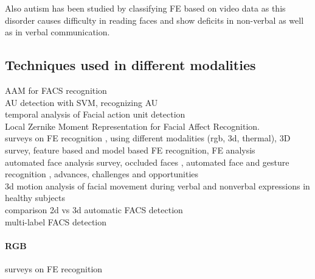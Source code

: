 Also autism has been studied by classifying FE based on video data \cite{Valstar2014automatic} as this disorder causes difficulty in reading faces and show deficits in non-verbal as well as in verbal communication.

\subsection{Techniques used in different modalities}




AAM for FACS recognition \cite{Lucey2007}\\


AU detection with SVM\cite{Simon2010}, recognizing AU \cite{Tian2001}\\

temporal analysis of Facial action unit detection \cite{Valstar2006}\\

Local Zernike Moment Representation for Facial Affect Recognition. \cite{Sariyanidi2013}\\

surveys on FE recognition \cite{Anil2016}\cite{Pantic2000}\cite{Sariyanidi2015}, using different modalities (rgb, 3d, thermal)\cite{Corneanu2016survey}, 3D \cite{Danelakis2015}survey\cite{Sandbach2012survey}, feature based and model based FE recognition\cite{Mishra2015}, FE analysis \cite{Tian2005}\\


automated face analysis \cite{Cohn2014}survey\cite{Fasel2003}, occluded faces \cite{Cotter2010}, automated face and gesture recognition \cite{de2015intraface}, advances, challenges and opportunities \cite{Martinez2016}\\


3d motion analysis of facial movement during verbal and nonverbal expressions in healthy subjects \cite{Sidequersky2016}\\

comparison 2d vs 3d automatic FACS detection \cite{Savran2012}\\

multi-label FACS detection \cite{Chu2016}\\



\paragraph{RGB}
surveys on FE recognition\cite{Anil2016}\cite{Pantic2000}\cite{Sariyanidi2015}


